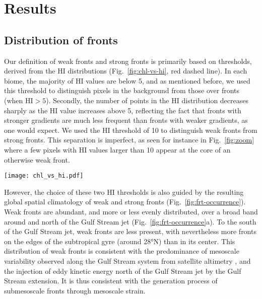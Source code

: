 \section{Results}

\subsection{Distribution of fronts}

Our definition of weak fronts and strong fronts is primarily based on thresholds, derived from the HI distributions (Fig.~\ref{fig:chl-vs-hi}, red dashed line).
In each biome, the majority of HI values are below 5, and as mentioned before, we used this threshold to distinguish pixels in the background from those over fronts (when \(\mathrm{HI} > 5\)).
Secondly, the number of points in the HI distribution decreases sharply as the HI value increases above 5, reflecting the fact that fronts with stronger  gradients are much less frequent than fronts with weaker gradients, as one would expect.
We used the HI threshold of 10 to distinguish weak fronts from strong fronts.
This separation is imperfect, as seen for instance in Fig.~\ref{fig:zoom} where a few pixels with HI values larger than 10 appear at the core of an otherwise weak front.

\begin{figure*}
  \texttt{[image: chl\_vs\_hi.pdf]}
  \caption{
    Normalized distribution of the Heterogeneity Index (HI, red dashed line) within each biome, and distribution of  as a function of HI (representing front strength), over the full period 2000--2020.
    Shown are the median value of the  distributions (solid black line), and 1st and 3rd quartiles (dashed lines).
    Note that 0.5\% of pixels have outstanding large HI values and are not included here.
  }%
  \label{fig:chl-vs-hi}
\end{figure*}

However, the choice of these two HI thresholds is also guided by the resulting global spatial climatology of weak and strong fronts (Fig.~\ref{fig:frt-occurrence}).
Weak fronts are abundant, and more or less evenly distributed, over a broad band around and north of the Gulf Stream jet (Fig.~\ref{fig:frt-occurrence}a).
To the south of the Gulf Stream jet, weak fronts are less present, with nevertheless more fronts on the edges of the subtropical gyre (around 28°N) than in its center.
This distribution of weak fronts is consistent with the predominance of mesoscale variability observed along the Gulf Stream system from satellite altimetry \citep{zhai_2008}, and the injection of eddy kinetic energy north of the Gulf Stream jet by the Gulf Stream extension.
It is thus consistent with the generation process of submesoscale fronts through mesoscale strain.

